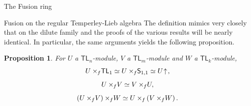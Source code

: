 \documentclass[reqno]{amsart}
\newtheorem{Prop}[Thm]{Proposition}
\newcommand{\tl}[1]{\mathsf{TL}_{#1}}
\newcommand{\ds}[1]{\mathsf S_{#1}}
\newcommand{\xf}{\times\hspace{-0.27em}_f}
\newcommand{\Ind}[1]{#1{}\hspace{-0.18em} \uparrow{}\hskip -0.18em}
\begin{document}
\begin{section}{The Fusion ring}
\begin{subsection}{Fusion on the regular Temperley-Lieb algebra}
The definition mimics very closely that on the dilute family and the proofs of the various results will be nearly identical. In particular, the same arguments yields the following proposition.
\begin{Prop}\label{prop:fusion_regular}
For $U$ a $\tl{n}$-module, $V$ a $\tl{m}$-module and $W$ a $\tl{k}$-module,
\begin{equation}
U \xf \tl{1} \simeq U \xf \ds{1,1} \simeq \Ind{U},
\end{equation}
\begin{equation}
U \xf V \simeq V\xf U,
\end{equation}
\begin{equation}
\left(U \xf V\right)\xf W \simeq U\xf \left(V \xf W \right).
\end{equation}
\end{Prop}
\end{subsection}
\end{section}
\end{document}
